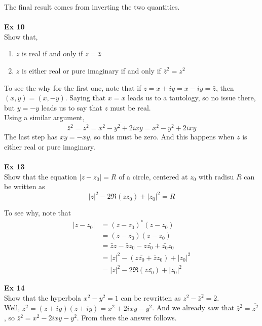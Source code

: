 The final result comes from inverting the two quantities.
\\~\\


\textbf{Ex 10}
\\
Show that,
\begin{enumerate}
    \item $z$ is real if and only if $z = \bar{z}$
    \item $z$ is either real or pure imaginary if and only if $\bar{z}^2 = z^2$
\end{enumerate}

To see the why for the first one, note that if $z = x + iy = x - iy = \bar{z}$,
then $(x, y) = (x, -y)$.
Saying that $x = x$ leads us to a tautology, so no issue there, but $y = -y$ leads us to say
that $z$ must be real.
\\

Using a similar argument,
$$
\bar{z}^2 = \overline{z^2} = \overline{x^2 - y^2 + 2ixy} = x^2 - y^2 + 2ixy
$$
The last step has $xy = -xy$, so this must be zero.
And this happens when $z$ is either real or pure imaginary.
\\~\\


\textbf{Ex 13}
\\
Show that the equation $|z - z_0| = R$ of a circle, centered at $z_0$ with radisu $R$
can be written as
$$
|z|^2 - 2\Re(zz_0) + |z_0|^2 = R
$$

To see why, note that
\begin{align*}
|z - z_0| &= (z - z_0)^* (z - z_0) \\
    &= (\bar{z} - \bar{z_0}) (z - z_0) \\
    &= \bar{z}z - \bar{z}z_0 - z\bar{z_0} + \bar{z_0}z_0 \\
    &= |z|^2 - (z\bar{z_0} + \bar{z}z_0) + |z_0|^2 \\
    &= |z|^2 - 2\Re(z\bar{z_0}) + |z_0|^2
\end{align*}


\textbf{Ex 14}
\\
Show that the hyperbola $x^2 - y^2 = 1$ can be rewritten as $z^2 - \bar{z}^2 = 2$.
\\

Well, $z^2 = (z + iy)(z + iy) = x^2 + 2ixy - y^2$.
And we already saw that $\bar{z}^2 = \overline{z^2}$, so $\bar{z}^2 = x^2 - 2ixy - y^2$.
From there the answer follows.



